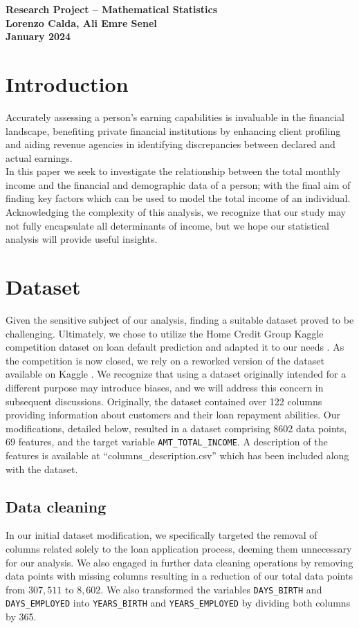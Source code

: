 \documentclass[hidelinks,12pt]{article}
\begin{document}
\begin{center}
  \textbf{\LARGE Research Project – Mathematical Statistics}\\[10pt]
  \textbf{Lorenzo Calda, Ali Emre Senel}\\[0pt]
\textbf{January 2024}
\end{center}
\vspace*{0.3cm}
\section{Introduction}
Accurately assessing a person's earning capabilities is invaluable in the financial landscape, benefiting private financial institutions by enhancing client profiling and aiding revenue agencies in identifying discrepancies between declared and actual earnings.\\
In this paper we seek to investigate the relationship between the total monthly income and the financial and demographic data of a person; with the final aim of finding key factors which can be used to model the total income of an individual. Acknowledging the complexity of this analysis, we recognize that our study may not fully encapsulate all determinants of income, but we hope our statistical analysis will provide useful insights.

\section{Dataset}
Given the sensitive subject of our analysis, finding a suitable dataset proved to be challenging. Ultimately, we chose to utilize the Home Credit Group Kaggle competition dataset on loan default prediction and adapted it to our needs \cite{home-credit-default-risk}. As the competition is now closed, we rely on a reworked version of the dataset available on Kaggle \cite{loan-defaulter}.  We recognize that using a dataset originally intended for a different purpose may introduce biases, and we will address this concern in subsequent discussions. Originally, the dataset contained over 122 columns providing information about customers and their loan repayment abilities. Our modifications, detailed below, resulted in a dataset comprising 8602 data points, 69 features, and the target variable \verb|AMT_TOTAL_INCOME|. A description of the features is available at ``columns\_description.csv'' which has been included along with the dataset.

\subsection{Data cleaning}
In our initial dataset modification, we specifically targeted the removal of columns related solely to the loan application process, deeming them unnecessary for our analysis. We also engaged in further data cleaning operations by removing data points with missing columns resulting in a reduction of our total data points from $307,511$ to $8,602$. We also transformed the variables \verb|DAYS_BIRTH| and \verb|DAYS_EMPLOYED| into \verb|YEARS_BIRTH| and \verb|YEARS_EMPLOYED| by dividing both columns by 365.
\end{document}
